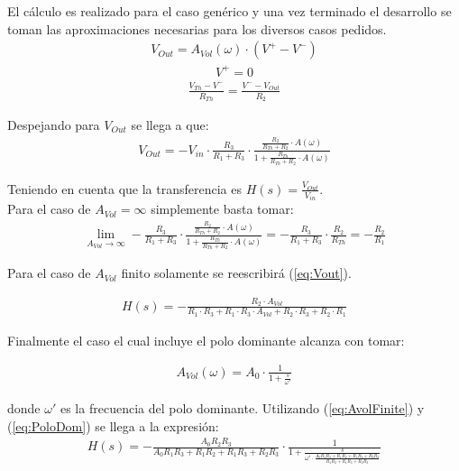 El cálculo es realizado para el caso genérico y una vez terminado el desarrollo se toman las aproximaciones necesarias para los diversos casos pedidos.
\begin{align}
V_{Out}= A_{Vol}(\omega) \cdot (V^+ - V^-)
\label{equ:avoligualvo}
\end{align}
\begin{align}
V^+=0\end{align}
\begin{align}\frac{V_{Th}-V^-}{R_{Th}}=\frac{V^--V_{Out}}{R_2}
\label{eq:nodeInv}
\end{align}

Despejando para $V_{Out}$ se llega a que:
\begin{align}
\label{eq:Vout}
V_{Out}=-V_{in} \cdot \frac{R_3}{R_1+R_3} \cdot \frac{\frac{R_2}{R_{Th}+R_2}\cdot A(\omega)}{1+\frac{R_{Th}}{R_{Th}+R_2}\cdot A(\omega)}
\end{align}

Teniendo en cuenta que la transferencia es $ H(s)=\frac{V_{Out}}{V_{in}}$.\\
Para el caso de $A_{Vol}=\infty$ simplemente basta tomar:
\begin{align}\lim_{A_{Vol}\to\infty} - \frac{R_3}{R_1+R_3} \cdot \frac{\frac{R_2}{R_{Th}+R_2}\cdot A(\omega)}{1+\frac{R_{Th}}{R_{Th}+R_2}\cdot A(\omega)} = -\frac{R_3}{R_1+R_3}\cdot\frac{R_2}{R_{Th}}=-\frac{R_2}{R_1}\end{align}

Para el caso de $A_{Vol}$ finito solamente se reescribirá (\ref{eq:Vout}).

\begin{align}
H(s)= -\frac{R_2\cdot A_{Vol}}{R_1\cdot R_3+R_1\cdot R_3 \cdot A_{Vol} +R_2\cdot R_3+R_2\cdot R_1}
\label{eq:AvolFinite}
\end{align}

Finalmente el caso el cual incluye el polo dominante alcanza con tomar: 

\begin{align}A_{Vol}(\omega)=A_0 \cdot \frac{1}{1+\frac{s}{\omega'}}
\label{eq:PoloDom}
\end{align}

donde $\omega'$ es la frecuencia del polo dominante. Utilizando (\ref{eq:AvolFinite}) y (\ref{eq:PoloDom}) se llega a la expresión:
\begin{align}
\label{eq:polodom}
H(s)=-\frac{A_0R_2R_3}{A_0R_1R_3+R_1R_2+R_1R_3+R_2R_3} \cdot\frac{1}{1+\frac{s}{\omega' \cdot \frac{A_0R_1R_3+R_1R_2+R_1R_3+R_2R_3}{R_1R_2+R_1R_3+R_2R_3}}}
\end{align}

